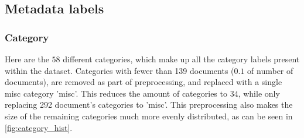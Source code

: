 \subsection{Metadata labels}\label{sec:appendix_meta_data}

\subsubsection{Category}\label{subsec:appendix_category}

Here are the $58$ different categories, which make up all the category labels present within the dataset.
Categories with fewer than 139 documents ($0.1$ of number of documents), are removed as part of preprocessing, and replaced with a single misc category 'misc'.
This reduces the amount of categories to $34$, while only replacing 292 document's categories to 'misc'.
This preprocessing also makes the size of the remaining categories much more evenly distributed, as can be seen in \autoref{fig:category_hist}.

